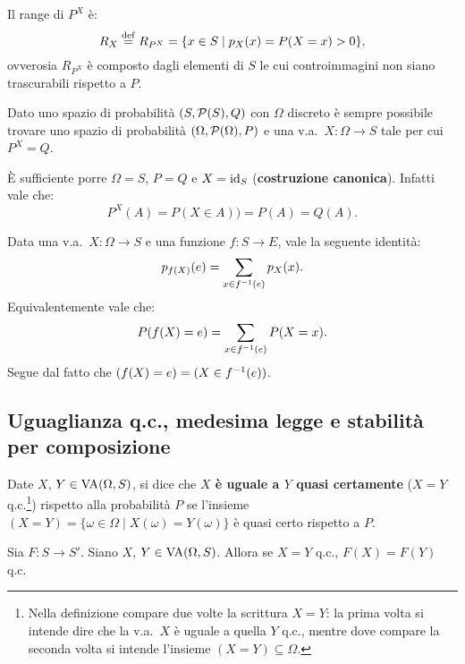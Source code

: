 \begin{multicols*}{2}
\begin{remark}
    Il range di $P^X$ è:
    \[ R_X \overset{\mathrm{def}}{=} R_{P^X} = \{x \in S \mid p_X(x) = P(X = x) > 0\}, \]
    ovverosia $R_{P^X}$ è composto dagli elementi di $S$ le cui
    controimmagini non siano trascurabili rispetto a $P$.
\end{remark}

\begin{remark}
    Dato uno spazio di probabilità $(S, \mathcal{P}(S), Q)$ con
    $\Omega$ discreto è sempre possibile trovare uno
    spazio di probabilità $(\Omega, \mathcal{P}(\Omega), P)$ e una
    v.a.~$X : \Omega \to S$ tale per cui $P^X = Q$. \smallskip

    È sufficiente porre $\Omega = S$, $P = Q$ e $X = \operatorname{id}_{S}$
    (\textbf{costruzione canonica}). Infatti vale che:
    \[
        P^X(A) = P(X \in A)) = P(A) = Q(A).
    \]
\end{remark}

\begin{proposition}
    Data una v.a.~$X : \Omega \to S$ e una funzione $f : S \to E$,
    vale la seguente identità:
    \[
        p_{f(X)}(e) = \sum_{x \in f^{-1}(e)} p_X(x).
    \]
    Equivalentemente vale che:
    \[
        P(f(X) = e) = \sum_{x \in f^{-1}(e)} P(X = x).
    \]
    Segue dal fatto che $(f(X) = e) = (X \in f^{-1}(e))$.
\end{proposition}

\subsection{Uguaglianza q.c., medesima legge e stabilità per composizione}

\begin{definition}
    Date $X$, $Y \in \operatorname{VA}(\Omega, S)$, si dice che
    \textbf{$X$ è uguale a $Y$ quasi certamente} ($X = Y$ q.c.\footnote{
        Nella definizione compare due volte la scrittura $X = Y$: la prima
        volta si intende dire che la v.a.~$X$ è uguale a quella $Y$ q.c.,
        mentre dove compare la seconda volta si intende l'insieme $(X=Y) \subseteq \Omega$.
    }) rispetto
    alla probabilità $P$ se
    l'insieme $(X = Y) = \{\omega \in \Omega \mid X(\omega) = Y(\omega)\}$
    è quasi certo rispetto a $P$.
\end{definition}

\begin{proposition}
    Sia $F : S \to S'$. Siano $X$, $Y \in \operatorname{VA}(\Omega, S)$. Allora se
    $X = Y$ q.c., $F(X) = F(Y)$ q.c. \smallskip


\end{proposition}
\end{multicols*}
